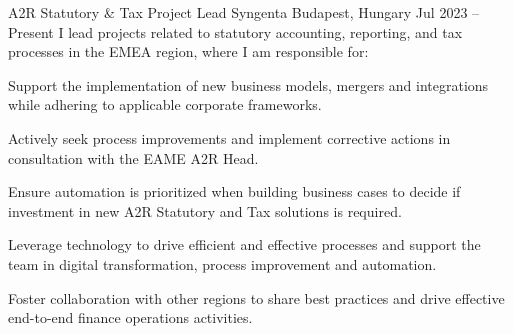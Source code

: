 


\begin{cventries}


  \cventry
    {A2R Statutory \& Tax Project Lead} %
    {Syngenta} %
    {Budapest, Hungary} %
    {Jul 2023 -- Present} %
    {I lead projects related to statutory accounting, reporting, and tax processes in the EMEA region, where I am responsible for:} %
    {
      \begin{cvitems} %
        \item {Support the implementation of new business models, mergers and integrations while adhering to applicable corporate frameworks.}
        \item {Actively seek process improvements and implement corrective actions in consultation with the EAME A2R Head.}
        \item {Ensure automation is prioritized when building business cases to decide if investment in new A2R Statutory and Tax solutions is required.}
        \item {Leverage technology to drive efficient and effective processes and support the team in digital transformation, process improvement and automation.}
        \item {Foster collaboration with other regions to share best practices and drive effective end-to-end finance operations activities.}
      \end{cvitems}
    }



\end{cventries}
